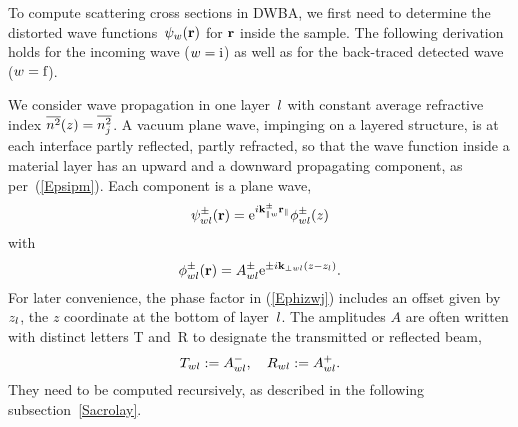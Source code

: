 To compute scattering cross sections in DWBA,
we first need to determine the distorted wave functions~$\psi_w(\mathbf{r})$
for $\mathbf{r}$ inside the sample.
The following derivation holds for the incoming wave ($w=\text{i}$)
as well as for the back-traced detected wave ($w=\text{f}$).

We consider wave propagation in one layer~$l$
%
with constant average refractive index $\overline{n^2}(z)=\overline{n_j^2}$.
A vacuum plane wave, impinging on a layered structure,
is at each interface partly reflected, partly refracted,
so that the wave function inside a material layer
has an upward and a downward propagating component,
as per~(\ref{Epsipm}).
Each component is a plane wave,
\begin{equation}
  \psi^\pm_{wl}(\mathbf{r})=\text{e}^{i\mathbf{k}^\pm_{\parallel w}\mathbf{r}_\parallel}\phi^\pm_{wl}(z)
\end{equation}
with
\begin{equation}\label{Ephizwj}
  \phi^\pm_{wl}(\mathbf{r})=A^\pm_{wl}\text{e}^{\pm i\mathbf{k}_{\perp wl}(z-z_l)}.
\end{equation}
%
For later convenience,
the phase factor in (\ref{Ephizwj}) includes an offset
given by~$z_l$, the $z$ coordinate at the bottom of layer~$l$.
The amplitudes $A$ are often written with distinct letters
T and~R to designate the transmitted or reflected beam,
\begin{equation}
  T_{wl} := A^-_{wl},\quad
  R_{wl} := A^+_{wl}.
\end{equation}
%
%
They need to be computed recursively,
as described in the following subsection~\ref{Sacrolay}.

